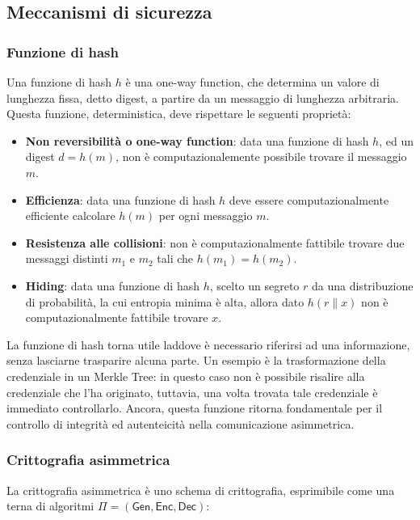 \documentclass[a4paper,12pt]{article}
\begin{document}
\subsection{Meccanismi di sicurezza}
\subsubsection{Funzione di hash}
Una funzione di hash $h$ è una one-way function, che determina un valore di lunghezza fissa, detto digest, a partire da un messaggio di lunghezza arbitraria. Questa funzione, deterministica, deve rispettare le seguenti proprietà:
\begin{itemize}
    \item \textbf{Non reversibilità o one-way function}: data una funzione di hash $h$, ed un digest $d=h(m)$, non è computazionalemente possibile trovare il messaggio $m$.
    \item \textbf{Efficienza}: data una funzione di hash $h$ deve essere computazionalmente efficiente calcolare $h(m)$ per ogni messaggio $m$.
    \item \textbf{Resistenza alle collisioni}: non è computazionalmente fattibile trovare due messaggi distinti $m_1$ e $m_2$ tali che $h(m_1)=h(m_2)$.
    \item \textbf{Hiding}: data una funzione di hash $h$, scelto un segreto $r$ da una distribuzione di probabilità, la cui entropia minima è alta, allora dato $h(r\|x)$ non è computazionalmente fattibile trovare $x$.
\end{itemize}
La funzione di hash torna utile laddove è necessario riferirsi ad una informazione, senza lasciarne trasparire alcuna parte. Un esempio è la trasformazione della credenziale in un Merkle Tree: in questo caso non è possibile risalire alla credenziale che l'ha originato, tuttavia, una volta trovata tale credenziale è immediato controllarlo.
\newline Ancora, questa funzione ritorna fondamentale per il controllo di integrità ed autenteicità nella comunicazione asimmetrica.

\subsubsection{Crittografia asimmetrica}
La crittografia asimmetrica è uno schema di crittografia, esprimibile come una terna di algoritmi $\Pi=\mathsf{(Gen, Enc, Dec)}$:
\end{document}
